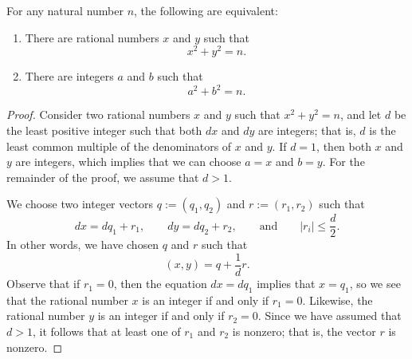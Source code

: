 \begin{theorem}\label{theorem:aubrys-theorem}
  For any natural number $n$, the following are equivalent:
  \begin{enumerate}
  \item There are rational numbers $x$ and $y$ such that
    \begin{equation*}
      x^2+y^2=n.
    \end{equation*}
  \item There are integers $a$ and $b$ such that
    \begin{equation*}
      a^2+b^2=n.
    \end{equation*}
  \end{enumerate}
\end{theorem}

\begin{proof}
  Consider two rational numbers $x$ and $y$ such that $x^2+y^2=n$, and let $d$ be the least positive integer such that both $dx$ and $dy$ are integers; that is, $d$ is the least common multiple of the denominators of $x$ and $y$. If $d=1$, then both $x$ and $y$ are integers, which implies that we can choose $a=x$ and $b=y$. For the remainder of the proof, we assume that $d>1$.

  We choose two integer vectors $q:=(q_1,q_2)$ and $r:=(r_1,r_2)$ such that
  \begin{equation*}
    dx=dq_1+r_1,\qquad dy=dq_2+r_2,\qquad\text{and}\qquad |r_i|\leq \frac{d}{2}.
  \end{equation*}
  In other words, we have chosen $q$ and $r$ such that
  \begin{equation*}
    (x,y)=q+\frac{1}{d}r.
  \end{equation*}
  Observe that if $r_1=0$, then the equation $dx=dq_1$ implies that $x=q_1$, so we see that the rational number $x$ is an integer if and only if $r_1=0$. Likewise, the rational number $y$ is an integer if and only if $r_2=0$. Since we have assumed that $d>1$, it follows that at least one of $r_1$ and $r_2$ is nonzero; that is, the vector $r$ is nonzero.
  

\end{proof}
